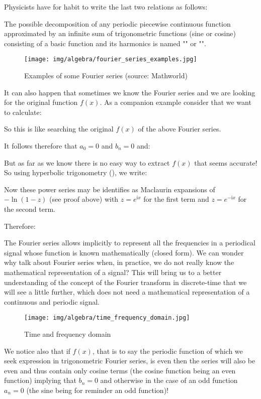 	Physicists have for habit to write the last two relations as follows:
	
	The possible decomposition of any periodic piecewise continuous function approximated by an infinite sum of trigonometric functions (sine or cosine) consisting of a basic function and its harmonics is named "" or "".
	\begin{figure}[H]
		\centering
		\texttt{[image: img/algebra/fourier\_series\_examples.jpg]}
		\caption[Examples of some Fourier series]{Examples of some Fourier series (source: Mathworld)}
	\end{figure}
	It can also happen that sometimes we know the Fourier series and we are looking for the original function $f(x)$. As a companion example consider that we want to calculate:
	
	So this is like searching the original $f(x)$ of the above Fourier series.

	It follows therefore that $a_0=0$ and $b_n=0$ and:
	
	But as far as we know there is no easy way to extract $f(x)$ that seems accurate! So using hyperbolic trigonometry (), we write:
	
	Now these power series may be identifies as Maclaurin expansions of $-\ln(1-z)$ (see proof above) with $z=e^{\mathrm{i}x}$ for the first term and $z=e^{-\mathrm{i}x}$ for the second term.

	Therefore:
	
	
	The Fourier series allows implicitly to represent all the frequencies in a periodical signal whose function is known mathematically (closed form). We can wonder why talk about Fourier series when, in practice, we do not really know the mathematical representation of a signal? This will bring us to a better understanding of the concept of the Fourier transform in discrete-time that we will see a little further, which does not need a mathematical representation of a continuous and periodic signal.
	\begin{figure}[H]
		\centering
		\texttt{[image: img/algebra/time\_frequency\_domain.jpg]}
		\caption{Time and frequency domain}
	\end{figure}
	We notice also that if $f (x)$, that is to say the periodic function of which we seek expression in trigonometric Fourier series, is even then the series will also be even and thus contain only cosine terms (the cosine function being an even function) implying that $b_n=0$ and otherwise in the case of an odd function $a_n=0$ (the sine being for reminder an odd function)!
	

